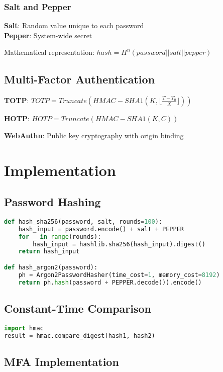 \documentclass[12pt,a4paper]{article}
\begin{document}
\subsubsection{Salt and Pepper}
\textbf{Salt}: Random value unique to each password\\
\textbf{Pepper}: System-wide secret

Mathematical representation: $hash = H^n(password || salt || pepper)$

\subsection{Multi-Factor Authentication}

\textbf{TOTP}: $TOTP = Truncate(HMAC-SHA1(K, \lfloor \frac{T - T_0}{X} \rfloor))$

\textbf{HOTP}: $HOTP = Truncate(HMAC-SHA1(K, C))$

\textbf{WebAuthn}: Public key cryptography with origin binding

\section{Implementation}

\subsection{Password Hashing}

\begin{lstlisting}[language=Python]
def hash_sha256(password, salt, rounds=100):
    hash_input = password.encode() + salt + PEPPER
    for _ in range(rounds):
        hash_input = hashlib.sha256(hash_input).digest()
    return hash_input

def hash_argon2(password):
    ph = Argon2PasswordHasher(time_cost=1, memory_cost=8192)
    return ph.hash(password + PEPPER.decode()).encode()
\end{lstlisting}

\subsection{Constant-Time Comparison}

\begin{lstlisting}[language=Python]
import hmac
result = hmac.compare_digest(hash1, hash2)
\end{lstlisting}

\subsection{MFA Implementation}
\end{document}
